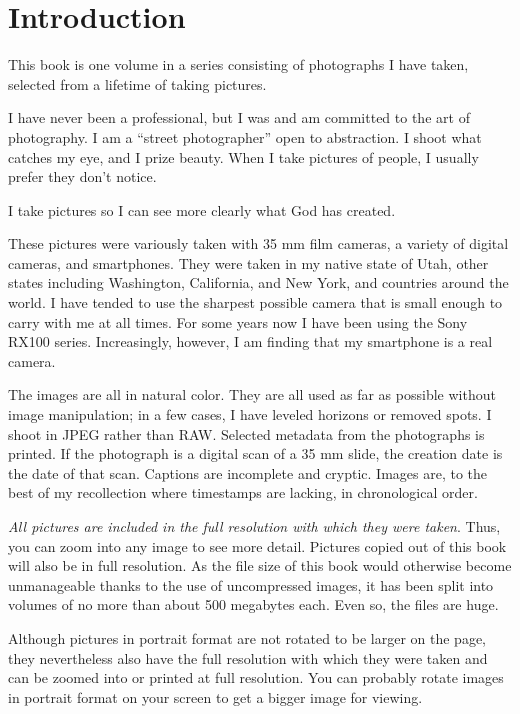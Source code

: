 \chapter{Introduction}

This book is one volume in a series consisting of photographs I have taken, selected from a lifetime of taking pictures. 

I have never been a professional, but I was and am committed to the art of photography. I am a ``street photographer'' open to abstraction. I shoot what catches my eye, and I prize beauty. When I take pictures of people, I usually prefer they don't notice. 

I take pictures so I can see more clearly what God has created.

These pictures were variously taken with 35 mm film cameras, a variety of digital cameras, and smartphones. They were taken in my native state of Utah, other states including Washington, California, and New York, and countries around the world. I have tended to use the sharpest possible camera that is small enough to carry with me at all times. For some years now I have been using the Sony RX100 series. Increasingly, however, I am finding that my smartphone is a real camera.

The images are all in natural color. They are all used as far as possible without image manipulation; in a few cases, I have leveled horizons or removed spots. I shoot in JPEG rather than RAW. Selected metadata from the photographs is printed. If the photograph is a digital scan of a 35 mm slide, the creation date is the date of that scan. Captions are incomplete and cryptic. Images are, to the best of my recollection where timestamps are lacking, in chronological order.

\emph{All pictures are included in the full resolution with which they were taken}. Thus, you can zoom into any image to see more detail. Pictures copied out of this book will also be in full resolution. As the file size of this book would otherwise become unmanageable thanks to the use of uncompressed images, it has been split into volumes of no more than about 500 megabytes each. Even so, the files are huge. 

Although pictures in portrait format are not rotated to be larger on the page, they nevertheless also have the full resolution with which they were taken and can be zoomed into or printed at full resolution. You can probably rotate images in portrait format on your screen to get a bigger image for viewing.

